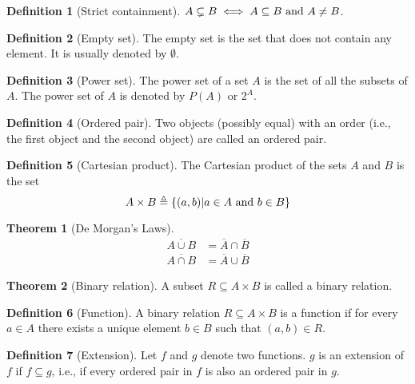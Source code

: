 \documentclass[fleqn, a4paper, 12pt, twoside]{article}
\theoremstyle{definition}
\newtheorem{definition}{Definition}
\theoremstyle{theorem}
\newtheorem{theorem}{Theorem}
\begin{document}
\begin{definition}[Strict containment]
	$A \subsetneq B \iff A \subseteq B \textnormal{ and } A \neq B$.
\end{definition}

\begin{definition}[Empty set]
	The empty set is the set that does not contain any element. It is usually denoted by $\emptyset$.
\end{definition}

\begin{definition}[Power set]
	The power set of a set $A$ is the set of all the subsets of $A$. The power set of $A$ is denoted by $P(A)$ or $2^A$.
\end{definition}

\begin{definition}[Ordered pair]
	Two objects (possibly equal) with an order (i.e., the first object and the second object) are called an ordered pair.
\end{definition}

\begin{definition}[Cartesian product]
	The Cartesian product of the sets $A$ and $B$ is the set 
	\begin{equation*}
		A \times B \triangleq \{ (a,b) | a \in A \textnormal{ and } b \in B \}
	\end{equation*}
\end{definition}

\begin{theorem}[De Morgan's Laws]\label{De Morgan's Laws}
	\begin{align*}
		\overline{A \cup B} &= \overline{A} \cap \overline{B}\\
		\overline{A \cap B} &= \overline{A} \cup \overline{B}
	\end{align*}
\end{theorem}

\begin{theorem}[Binary relation]
	A subset $R \subseteq A \times B$ is called a binary relation.
\end{theorem}

\begin{definition}[Function]
	A binary relation $R \subseteq A \times B$ is a function if for every $a \in A$ there exists a unique element $b \in B$ such that $(a,b) \in R$.
\end{definition}

\begin{definition}[Extension]
	Let $f$ and $g$ denote two functions. $g$ is an extension of $f$ if $f \subseteq g$, i.e., if every ordered pair in $f$ is also an ordered pair in $g$.
\end{definition}
\end{document}
